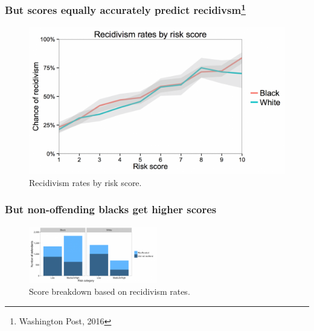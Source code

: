 \begin{frame}
  \frametitle{But scores equally accurately predict recidivsm\footnote{Washington Post, 2016}}
  \begin{figure}[H]
    \centering
    \includegraphics[width=\columnwidth]{../figures/imrs}
    \caption{Recidivism rates by risk score.}
    \label{fig:imrs}
  \end{figure}
\end{frame}
\begin{frame}
  \frametitle{But non-offending blacks get higher scores}
  \begin{figure}[H]
    \centering
    \includegraphics[width=0.5\textwidth]{../figures/imrs-risk}
    \caption{Score breakdown based on recidivism rates.}
    \label{fig:imrs-risk}
  \end{figure}
\end{frame}

